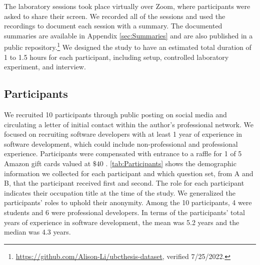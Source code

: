 The laboratory sessions took place virtually over Zoom, where participants were asked to share their screen.
We recorded all of the sessions and used the recordings to document each session with a summary.
The documented summaries are available in Appendix \ref{sec:Summaries} 
and are also published in a public repository.\footnote{\url{https://github.com/Alison-Li/ubcthesis-dataset}, verified 7/25/2022.}
We designed the study to have an estimated total duration of 1 to 1.5 hours for each participant,
including setup, controlled laboratory experiment, and interview.

\subsection{Participants}

We recruited 10 participants through public posting on social media and circulating a letter of initial contact within the author's professional network.
We focused on recruiting software developers with at least 1 year of experience in software development, 
which could include non-professional and professional experience.
Participants were compensated with entrance to a raffle for 1 of 5 Amazon gift cards valued at $\$40$ .
\autoref{tab:Participants} shows the demographic information we collected for each participant and 
which question set, from A and B, that the participant received first and second.
The role for each participant indicates their occupation title at the time of the study.
We generalized the participants' roles to uphold their anonymity.
Among the 10 participants, 4 were students and 6 were professional developers.
In terms of the participants' total years of experience in software development, 
the mean was 5.2 years and the median was 4.3 years.

